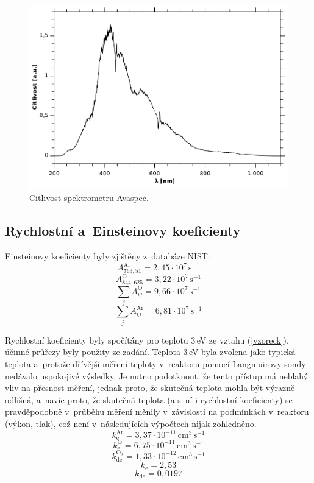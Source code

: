\documentclass[12pt]{article}
\begin{document}
\begin{figure}[htbp]
\begin{center}
\includegraphics[width=13cm]{citlivost.pdf}
\caption{Citlivost spektrometru Avaspec.}
\label{citlivost}
\end{center}
\end{figure}

\subsection{Rychlostní a~Einsteinovy koeficienty}
Einsteinovy koeficienty byly zjištěny z~databáze NIST:
$$ A_{763,51}^\mathrm{Ar} = 2,45 \cdot 10^7\,\mathrm{s}^{-1} $$
$$ A_{844,625}^\mathrm{O} = 3,22 \cdot 10^7\,\mathrm{s}^{-1} $$
$$ \sum_j A_{ij}^\mathrm{O} = 9,66 \cdot 10^7\,\mathrm{s}^{-1} $$
$$ \sum_j A_{ij}^\mathrm{Ar} = 6,81 \cdot 10^7\,\mathrm{s}^{-1} $$

Rychlostní koeficienty byly spočítány pro teplotu 3\,eV ze vztahu (\ref{vzoreck}), účinné průřezy byly použity ze zadání. Teplota 3\,eV byla zvolena jako typická teplota a~protože dřívější měření teploty v~reaktoru pomocí Langmuirovy sondy nedávalo uspokojivé výsledky. Je nutno podotknout, že tento přístup má neblahý vliv na přesnost měření, jednak proto, že skutečná teplota mohla být výrazně odlišná, a~navíc proto, že skutečná teplota (a s~ní i rychlostní koeficienty) se pravděpodobně v~průběhu měření měnily v~závislosti na podmínkách v~reaktoru (výkon, tlak), což není v~následujících výpočtech nijak zohledněno. 
$$ k_\mathrm{e}^\mathrm{Ar} = 3,37 \cdot 10^{-11}\,\mathrm{cm}^3\,\mathrm{s}^{-1} $$
$$ k_\mathrm{e}^\mathrm{O} = 6,75 \cdot 10^{-11}\,\mathrm{cm}^3\,\mathrm{s}^{-1} $$
$$ k_\mathrm{de}^\mathrm{O_2} = 1,33 \cdot 10^{-12}\,\mathrm{cm}^3\,\mathrm{s}^{-1} $$
$$ k_\mathrm{e}  = 2,53 $$
$$ k_\mathrm{de}  = 0,0197 $$
\end{document}
